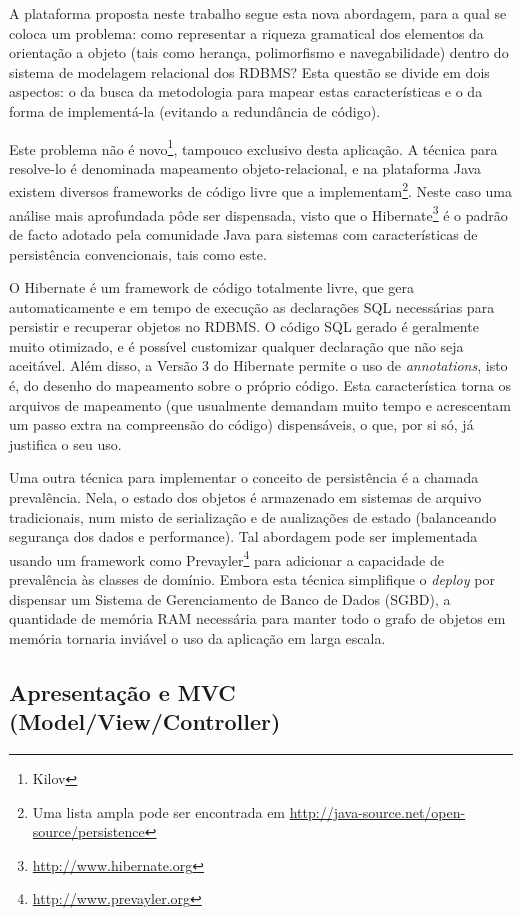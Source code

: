 \documentclass{abnt}
\begin{document}
A plataforma proposta neste trabalho segue esta nova abordagem, para a qual se coloca um problema: como representar a riqueza gramatical dos elementos da orientação a objeto (tais como herança, polimorfismo e navegabilidade) dentro do sistema de modelagem relacional dos RDBMS? Esta questão se divide em dois aspectos: o da busca da metodologia para mapear estas características e o da forma de implementá-la (evitando a redundância de código).

	Este problema não é novo\footnote{Kilov}, tampouco exclusivo desta aplicação. A técnica para resolve-lo é denominada mapeamento objeto-relacional, e na plataforma Java existem diversos frameworks de código livre que a implementam\footnote{Uma lista ampla pode ser encontrada em \url{http://java-source.net/open-source/persistence}}. Neste caso uma análise mais aprofundada pôde ser dispensada, visto que o Hibernate\footnote{\url{http://www.hibernate.org}} é o padrão de facto adotado pela comunidade Java para sistemas com características de persistência convencionais, tais como este.

	O Hibernate é um framework de código totalmente livre, que gera automaticamente e em tempo de execução as declarações SQL necessárias para persistir e recuperar objetos no RDBMS. O código SQL gerado é geralmente muito otimizado, e é possível customizar qualquer declaração que não seja aceitável. Além disso, a Versão 3 do Hibernate permite o uso de \textit{annotations}, isto é, do desenho do mapeamento sobre o próprio código. Esta característica torna os arquivos de mapeamento (que usualmente demandam muito tempo e acrescentam um passo extra na compreensão do código) dispensáveis, o que, por si só, já justifica o seu uso.

	Uma outra técnica para implementar o conceito de persistência é a chamada prevalência. Nela, o estado dos objetos é armazenado em sistemas de arquivo tradicionais, num misto de serialização e de aualizações de estado (balanceando segurança dos dados e performance). Tal abordagem pode ser implementada usando um framework como Prevayler\footnote{\url{http://www.prevayler.org}} para adicionar a capacidade de prevalência às classes de domínio. Embora esta técnica simplifique o \textit{deploy} por dispensar um Sistema de Gerenciamento de Banco de Dados (SGBD), a quantidade de memória RAM necessária para manter todo o grafo de objetos em memória tornaria inviável o uso da aplicação em larga escala.

	\subsection{Apresentação e MVC (Model/View/Controller)}
\end{document}
